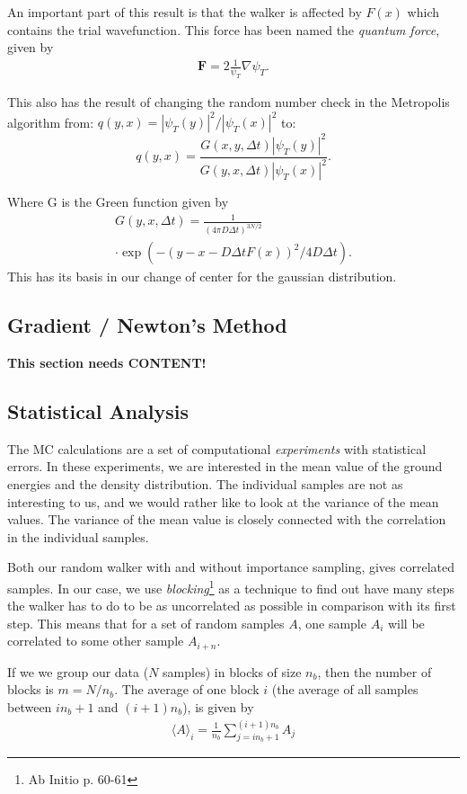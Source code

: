 \documentclass[twocolumns, a4paper,11pt,fleqn]{extarticle}
\newcommand{\eq}[1]{{\small\begin{align*}#1\end{align*}}}
\renewcommand\vec[1]{\boldsymbol{\mathbf{#1}}}
\begin{document}
An important part of this result is that the walker is affected by $F(x)$
which contains the trial wavefunction. This force has been named 
the \textit{quantum force}, given by
\begin{align*}
\vec F = 2\frac{1}{\psi_T}\nabla \psi_T. 
\end{align*}

This also has the result of changing the random number check in the 
Metropolis algorithm from:
$q(y,x) = |\psi_T(y)|^2/|\psi_T(x)|^2$ to: 
\[
q(y,x) = \frac{G(x,y,\Delta t)|\psi_T(y)|^2}{G(y,x,\Delta t)|\psi_T(x)|^2}.
\]

Where G is the Green function given by
\eq{
  G(y,x,\Delta t) =  \frac{1}{(4\pi D\Delta t)^{3N/2}}\\ \cdot \exp{\left(-(y-x-D\Delta t F(x))^2/4D\Delta t\right)}.
}
This has its basis in our change of center for the gaussian distribution.

\subsection{Gradient / Newton's Method}
{\bfseries\Large This section needs CONTENT!}

\subsection{Statistical Analysis}
The MC calculations are a set of computational \textit{experiments} 
with statistical errors. In these experiments, we are interested in the mean
value of the ground energies and the density distribution. The 
individual samples are not as interesting to us, and we would rather like
to look at the variance of the mean values. 
The variance of the mean value is closely connected with the correlation
in the individual samples. 


Both our random walker with and without importance sampling, gives correlated
samples. In our case, we use \textit{blocking}\footnote{Ab Initio p. 60-61}
as a technique to find out have many steps
the walker has to do to be as uncorrelated as possible in comparison with its first step.
This means that for a set of random samples $A$, one sample $A_i$ will be correlated
to some other sample $A_{i+n}$.

If we we group our data ($N$ samples) in blocks of size $n_b$,
then the number of blocks is $m = N/n_b$.
The average of one block $i$ (the average of all samples
between $i n_b + 1$ and $(i+1)n_b$), is given by 
\eq{
\langle A \rangle_i = \frac{1}{n_b}\sum_{j=in_b+1}^{(i+1)n_b} A_j
}
\end{document}
